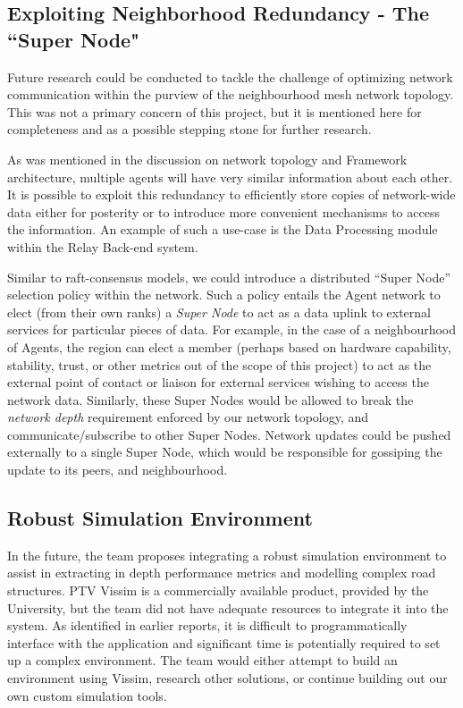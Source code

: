 \documentclass{report}
\begin{document}
\subsection{Exploiting Neighborhood Redundancy - The ``Super Node"}  %
Future research could be conducted to tackle the challenge of optimizing network communication within the purview of the neighbourhood mesh network topology.
This was not a primary concern of this project, but it is mentioned here for completeness and as a possible stepping stone for further research.

As was mentioned in the discussion on network topology and Framework architecture, multiple agents will have very similar information about each other.
It is possible to exploit this redundancy to efficiently store copies of network-wide data either for posterity or to introduce more convenient mechanisms to access the information.
An example of such a use-case is the Data Processing module within the Relay Back-end system.

Similar to raft-consensus models, we could introduce a distributed ``Super Node'' selection policy within the network.
Such a policy entails the Agent network to elect (from their own ranks) a \emph{Super Node} to act as a data uplink to external services for particular pieces of data.
For example, in the case of a neighbourhood of Agents, the region can elect a member (perhaps based on hardware capability, stability, trust, or other metrics out of the scope of this project) to act as the external point of contact or liaison for external services wishing to access the network data.
Similarly, these Super Nodes would be allowed to break the \emph{network depth} requirement enforced by our network topology, and communicate/subscribe to other Super Nodes.
Network updates could be pushed externally to a single Super Node, which would be responsible for gossiping the update to its peers, and neighbourhood.

\subsection{Robust Simulation Environment}
In the future, the team proposes integrating a robust simulation environment to assist in extracting in depth performance metrics and modelling complex road structures. 
PTV Vissim is a commercially available product, provided by the University, but the team did not have adequate resources to integrate it into the system. 
As identified in earlier reports, it is difficult to programmatically interface with the application and significant time is potentially required to set up a complex environment. 
The team would either attempt to build an environment using Vissim, research other solutions, or continue building out our own custom simulation tools.
\end{document}
